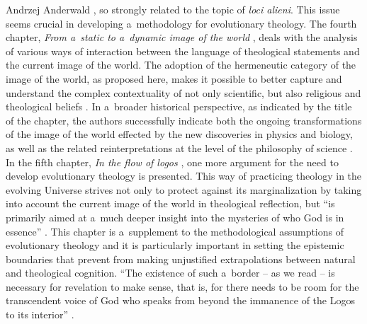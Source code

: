 \begin{newrevengenv}{Andrzej Anderwald}
\parencite*[][pp.77–84]{grygiel_teologia_2022}, %
 so strongly related to the topic of \textit{loci alieni}. This issue seems crucial in developing a~methodology for evolutionary theology. The fourth chapter, \textit{From a~static to a~dynamic image of the world} 
\parencite*[][pp.85–121]{grygiel_teologia_2022}, %
 deals with the analysis of various ways of interaction between the language of theological statements and the current image of the world. The adoption of the hermeneutic category of the image of the world, as proposed here, makes it possible to better capture and understand the complex contextuality of not only scientific, but also religious and theological beliefs 
\parencite*[][pp.86–87]{grygiel_teologia_2022}. %
 In a~broader historical perspective, as indicated by the title of the chapter, the authors successfully indicate both the ongoing transformations of the image of the world effected by the new discoveries in physics and biology, as well as the related reinterpretations at the level of the philosophy of science 
\parencite[e.g.,][pp.119–120]{grygiel_teologia_2022}. %
 In the fifth chapter, \textit{In the flow of logos} 
\parencite*[][pp.122–151]{grygiel_teologia_2022}, %
 one more argument for the need to develop evolutionary theology is presented. This way of practicing theology in the evolving Universe strives not only to protect against its marginalization by taking into account the current image of the world in theological reflection, but ``is primarily aimed at a~much deeper insight into the mysteries of who God is in essence'' 
\parencite*[][p.122]{grygiel_teologia_2022}. %
 This chapter is a~supplement to the methodological assumptions of evolutionary theology and it is particularly important in setting the epistemic boundaries that prevent from making unjustified extrapolations between natural and theological cognition. ``The existence of such a~border -- as we read -- is necessary for revelation to make sense, that is, for there needs to be room for the transcendent voice of God who speaks from beyond the immanence of the Logos to its interior'' 
\parencite*[][p.146]{grygiel_teologia_2022}.%





\end{newrevengenv}
